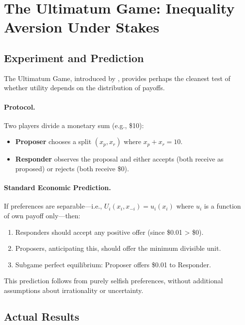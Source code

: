 \documentclass[12pt,oneside]{book}
\begin{document}
\section{The Ultimatum Game: Inequality Aversion Under Stakes}

\subsection{Experiment and Prediction}

The Ultimatum Game, introduced by \citet{guth1982}, provides perhaps the cleanest test of whether
utility depends on the distribution of payoffs.

\paragraph{Protocol.} Two players divide a monetary sum (e.g., \$10):
\begin{itemize}
  \item \textbf{Proposer} chooses a split $(x_p, x_r)$ where $x_p + x_r = 10$.
  \item \textbf{Responder} observes the proposal and either accepts (both receive as proposed)
        or rejects (both receive \$0).
\end{itemize}

\paragraph{Standard Economic Prediction.} If preferences are separable—i.e., $U_i(x_i, x_{-i}) = u_i(x_i)$
where $u_i$ is a function of own payoff only—then:

\begin{enumerate}
  \item Responders should accept any positive offer (since \$0.01 > \$0).
  \item Proposers, anticipating this, should offer the minimum divisible unit.
  \item Subgame perfect equilibrium: Proposer offers \$0.01 to Responder.
\end{enumerate}

This prediction follows from purely selfish preferences, without additional assumptions about
irrationality or uncertainty.

\subsection{Actual Results}
\end{document}
